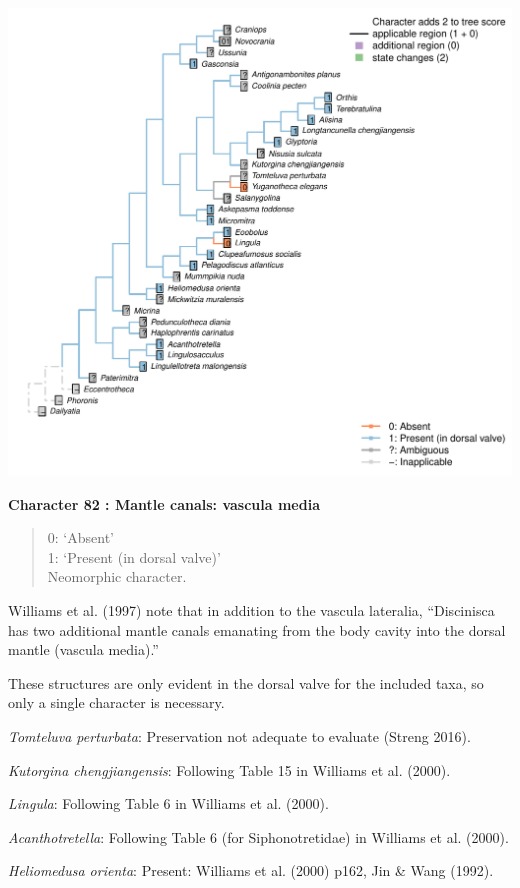 \documentclass[]{book}
\theoremstyle{definition}
\theoremstyle{definition}
\theoremstyle{definition}
\theoremstyle{remark}
\begin{document}
\includegraphics{Brachiopod_phylogeny_files/figure-latex/unnamed-chunk-5-82.pdf}

\textbf{Character 82 : Mantle canals: vascula media }

\begin{quote}
0: `Absent'\\
1: `Present (in dorsal valve)'\\
Neomorphic character.
\end{quote}

Williams et al. (1997) note that in addition to the vascula lateralia,
``Discinisca has two additional mantle canals emanating from the body
cavity into the dorsal mantle (vascula media).''

These structures are only evident in the dorsal valve for the included
taxa, so only a single character is necessary.

\emph{Tomteluva perturbata}: Preservation not adequate to evaluate
(Streng 2016).

\emph{Kutorgina chengjiangensis}: Following Table 15 in Williams et al.
(2000).

\emph{Lingula}: Following Table 6 in Williams et al. (2000).

\emph{Acanthotretella}: Following Table 6 (for Siphonotretidae) in
Williams et al. (2000).

\emph{Heliomedusa orienta}: Present: Williams et al. (2000) p162, Jin \&
Wang (1992).
\end{document}

